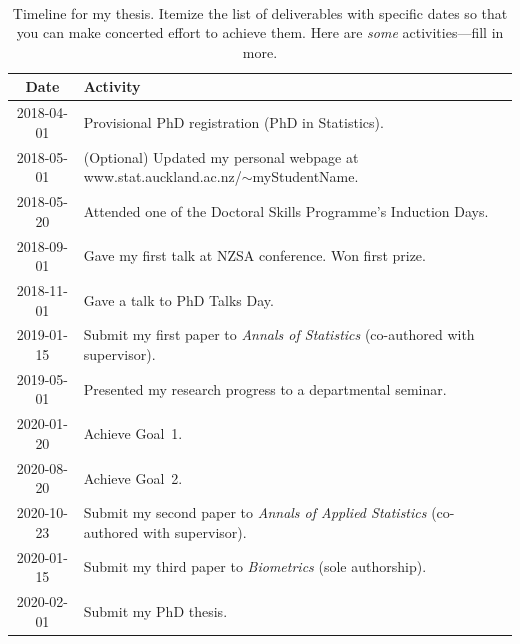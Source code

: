 \documentclass[12pt,a4paper]{article}
\begin{document}
\begin{table}[hh]
\caption{
Timeline for my thesis.
Itemize the list of deliverables with specific dates so that
you can make concerted effort to achieve them.
Here are \textit{some} activities---fill in more.
}
\centering
\ ~~~~ \\
\label{tab:timeline}
\begin{tabular}{|c|l|}
\hline
Date & Activity \\
\hline
2018-04-01 & Provisional PhD registration (PhD in Statistics). \\
2018-05-01 & (Optional)
             Updated my personal webpage at
             \textsf{www.stat.auckland.ac.nz/$\sim$myStudentName}. \\
2018-05-20 & Attended one of the
             Doctoral Skills Programme's Induction Days. \\
2018-09-01 & Gave my first talk at NZSA conference. Won first prize. \\
2018-11-01 & Gave a talk to PhD Talks Day. \\
2019-01-15 & Submit my first paper to \textit{Annals of Statistics}
             (co-authored with supervisor). \\
2019-05-01 & Presented my research progress to a departmental seminar. \\
2020-01-20 & Achieve Goal~1. \\
2020-08-20 & Achieve Goal~2. \\
2020-10-23 & Submit my second paper to \textit{Annals of Applied Statistics}
             (co-authored with supervisor). \\
2020-01-15 & Submit my third paper to \textit{Biometrics}
             (sole authorship). \\
2020-02-01 & Submit my PhD thesis. \\
\hline
\end{tabular}
\end{table}
\end{document}
